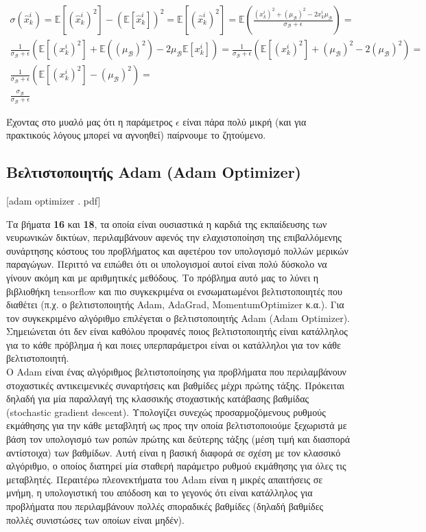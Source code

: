 \documentclass[11pt]{article} %
\numberwithin{equation}{subsection}
\begin{document}
\begin{align*}
\sigma(\hat{x}_k^i) =   \mathbb{E}[(\hat{x}_k^i)^2] - (\mathbb{E}[\hat{x}_k^i])^2  =  \mathbb{E}[(\hat{x}_k^i)^2] = \mathbb{E}\left( \frac{(x_k^i)^2 + (\mu_{\mathcal{B}})^2 - 2x_k^i \mu_{\mathcal{B}}}{\sigma_{\mathcal{B}} + \epsilon}\right) =\\
 \frac{1}{\sigma_{\mathcal{B}} + \epsilon} \left(\mathbb{E}[(x_k^i)^2] + \mathbb{E}((\mu_{\mathcal{B}})^2) - 2\mu_{\mathcal{B}} \mathbb{E}[x_k^i]\right) =  \frac{1}{\sigma_{\mathcal{B}} + \epsilon} \left(\mathbb{E}[(x_k^i)^2] + (\mu_{\mathcal{B}})^2 - 2(\mu_{\mathcal{B}})^2\right) = \\
\frac{1}{\sigma_{\mathcal{B}} + \epsilon} \left(\mathbb{E}[(x_k^i)^2] - (\mu_{\mathcal{B}})^2\right) = \\
\frac{\sigma_{\mathcal{B}}}{\sigma_{\mathcal{B}} + \epsilon}
\end{align*}

Έχοντας στο μυαλό μας ότι η παράμετρος $\epsilon$ είναι πάρα πολύ μικρή (και για πρακτικούς λόγους μπορεί να αγνοηθεί) παίρνουμε το ζητούμενο.

\subsection{Βελτιστοποιητής Adam (Adam Optimizer)}
[adam optimizer . pdf]

Τα βήματα \textbf{16} και \textbf{18}, τα οποία είναι ουσιαστικά η καρδιά της εκπαίδευσης των νευρωνικών δικτύων, περιλαμβάνουν αφενός την ελαχιστοποίηση της επιβαλλόμενης συνάρτησης κόστους του προβλήματος και αφετέρου τον υπολογισμό πολλών μερικών παραγώγων. Περιττό να ειπώθει ότι οι υπολογισμοί αυτοί είναι πολύ δύσκολο να γίνουν ακόμη και με αριθμητικές μεθόδους. Το πρόβλημα αυτό μας το λύνει η βιβλιοθήκη tensorflow και πιο συγκεκριμένα οι ενσωματωμένοι βελτιστοποιητές που διαθέτει (π.χ. ο βελτιστοποιητής Adam, AdaGrad, MomentumOptimizer κ.α.). Για τον συγκεκριμένο αλγόριθμο επιλέγεται ο βελτιστοποιητής Adam (Adam Optimizer). Σημειώνεται ότι δεν είναι καθόλου προφανές ποιος βελτιστοποιητής είναι κατάλληλος για το κάθε πρόβλημα ή και ποιες υπερπαράμετροι είναι οι κατάλληλοι για τον κάθε βελτιστοποιητή.\\

Ο Adam είναι ένας αλγόριθμος βελτιστοποίησης για προβλήματα που περιλαμβάνουν στοχαστικές αντικειμενικές συναρτήσεις και βαθμίδες μέχρι πρώτης τάξης. Πρόκειται δηλαδή για μία παραλλαγή της κλασσικής στοχαστικής κατάβασης βαθμίδας (stochastic gradient descent). Υπολογίζει συνεχώς προσαρμοζόμενους ρυθμούς εκμάθησης για την κάθε μεταβλητή ως προς την οποία βελτιστοποιούμε ξεχωριστά με βάση τον υπολογισμό των ροπών πρώτης και δεύτερης τάξης (μέση τιμή και διασπορά αντίστοιχα) των βαθμίδων. Αυτή είναι η βασική διαφορά σε σχέση με τον κλασσικό αλγόριθμο, ο οποίος διατηρεί μία σταθερή παράμετρο ρυθμού εκμάθησης για όλες τις μεταβλητές. Περαιτέρω πλεονεκτήματα του Adam είναι η μικρές απαιτήσεις σε μνήμη, η υπολογιστική του απόδοση και το γεγονός ότι είναι κατάλληλος για προβλήματα που περιλαμβάνουν πολλές σποραδικές βαθμίδες (δηλαδή βαθμίδες πολλές συνιστώσες των οποίων είναι μηδέν). 
\end{document}
